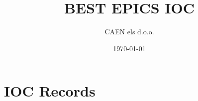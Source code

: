 \documentclass[12pt]{scrartcl}
\title{BEST EPICS IOC}
\author{CAEN els d.o.o.}
\date{\today}
\begin{document}
\maketitle

\clearpage

\tableofcontents

\clearpage
\section{IOC Records}

\end{document}
